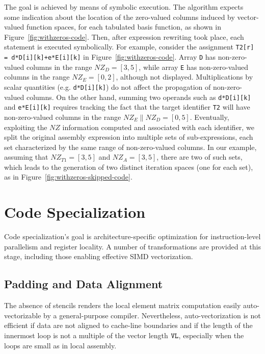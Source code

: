 The goal is achieved by means of symbolic execution. The algorithm expects some indication about the location of the zero-valued columns induced by vector-valued function spaces, for each tabulated basis function, as shown in Figure~\ref{fig:withzeros-code}. Then, after expression rewriting took place, each statement is executed symbolically. For example, consider the assignment \texttt{T2[r] = d*D[i][k]+e*E[i][k]} in Figure~\ref{fig:withzeros-code}. Array \texttt{D} has non-zero-valued columns in the range $NZ_D=[3,5]$, while array \texttt{E} has non-zero-valued columns in the range $NZ_E=[0,2]$, although not displayed. Multiplications by scalar quantities (e.g. \texttt{d*D[i][k]}) do not affect the propagation of non-zero-valued columns. On the other hand, summing two operands such as \texttt{d*D[i][k]} and \texttt{e*E[i][k]} requires tracking the fact that the target identifier \texttt{T2} will have non-zero-valued columns in the range $NZ_E \| NZ_D=[0,5]$. Eventually, exploiting the $NZ$ information computed and associated with each identifier, we split the original assembly expression into multiple sets of sub-expressions, each set characterized by the same range of non-zero-valued columns. In our example, assuming that $NZ_{T1}=[3,5]$ and $NZ_A=[3,5]$, there are two of such sets, which leads to the generation of two distinct iteration spaces (one for each set), as in Figure~\ref{fig:withzeros-skipped-code}.

\section{Code Specialization}
\label{sec:coffee-code-spec}
Code specialization's goal is architecture-specific optimization for instruction-level parallelism and register locality. A number of transformations are provided at this stage, including those enabling effective SIMD vectorization. 

\subsection{Padding and Data Alignment}
\label{sec:coffee-padding}
The absence of stencils renders the local element matrix computation easily auto-vectorizable by a general-purpose compiler. Nevertheless, auto-vectorization is not efficient if data are not aligned to cache-line boundaries and if the length of the innermost loop is not a multiple of the vector length $\mbox{\texttt{VL}}$, especially when the loops are small as in local assembly. 

